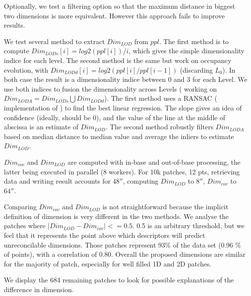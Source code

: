 		Optionally, we test a filtering option so that the maximum distance in biggest two dimensions is more equivalent. However this approach fails to improve results.
		
		We test several method to extract $Dim_{LOD}$ from $ppl$.
		The first method is to compute $ Dim_{LODs}[i] = log2(ppl[i])/i$,
		which gives the simple dimensionality indice for each level.
		The second method is the same but work on occupancy evolution, with
		$Dim_{LODd}[i] = log2(ppl[i]/ppl[i-1])$ (discarding $L_0$).
		In both case the result is a dimensionality indice between 0 and 3 for each Level.
		We use both indices to fusion the dimensionality across Levels (  working on $Dim_{LODA} = Dim_{LODs}\bigcup Dim_{LODd}$).
		The first method uses a RANSAC (\cite{SciPy2014} implementation of \cite{Choi2009}) 
		to find the best linear regression. The slope gives an idea of confidence (ideally, should be 0),
		and the value of the line at the middle of abscissa is an estimate of $Dim_{LOD}$.
		The second method robustly filters $Dim_{LODA}$ based on median distance to median value and
		average the inliers to estimate $Dim_{LOD}$.
		
		$Dim_{cov}$ and $Dim_{LOD}$ are computed with in-base and out-of-base processing, the latter 
		being executed in parallel (8 workers).
		For 10k patches, 12 \mega pts, retrieving data and writing result accounts for $48\second$, computing $Dim_{LOD}$ to $8\second$, $Dim_{cov}$ to $64\second$.
		
		Comparing $Dim_{cov}$ and $Dim_{LOD}$ is not straightforward because the implicit definition of dimension is very different in the two methods.
		We analyse the patches where $\lvert Dim_{LOD} -  Dim_{cov}\rvert <=0.5$.
		0.5 is an arbitrary threshold,
		but we feel that it represents the point above which descriptors will predict unreconcilable dimensions.
		Those patches represent 93\% of the data set (0.96 \% of points), with a correlation of 0.80.
		Overall the proposed dimensions are similar for the majority of patch, especially for well filled 1D and 2D patches.
		
		We display the 684 remaining patches to look for possible explanations of the difference in dimension.
		
